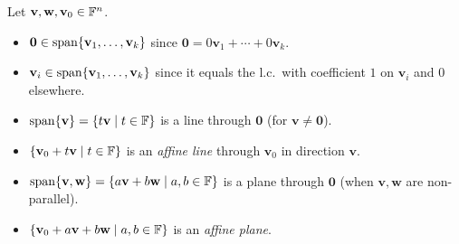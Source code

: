\begin{tipbox}
Let $\mathbf{v},\mathbf{w},\mathbf{v}_0\in\mathbb{F}^n$.
\begin{itemize}
    \item $\mathbf{0}\in\operatorname{span}\{\mathbf{v}_1,\ldots,\mathbf{v}_k\}$ since
          $\mathbf{0}=0\mathbf{v}_1+\cdots+0\mathbf{v}_k$.
    \item $\mathbf{v}_i\in\operatorname{span}\{\mathbf{v}_1,\ldots,\mathbf{v}_k\}$ since it
          equals the l.c.\ with coefficient $1$ on $\mathbf{v}_i$ and $0$
          elsewhere.
    \item $\operatorname{span}\{\mathbf{v}\} = \{t\mathbf{v}\mid t\in\mathbb{F}\}$ is a line through
          $\mathbf{0}$ (for $\mathbf{v}\neq\mathbf{0}$).
    \item $\{\mathbf{v}_0+t\mathbf{v}\mid t\in\mathbb{F}\}$ is an \emph{affine line}
          through $\mathbf{v}_0$ in direction $\mathbf{v}$.
    \item $\operatorname{span}\{\mathbf{v},\mathbf{w}\} = \{a\mathbf{v}+b\mathbf{w}\mid a,b\in\mathbb{F}\}$
          is a plane through $\mathbf{0}$ (when $\mathbf{v},\mathbf{w}$ are
          non-parallel).
    \item $\{\mathbf{v}_0+a\mathbf{v}+b\mathbf{w}\mid a,b\in\mathbb{F}\}$ is an
          \emph{affine plane}.
\end{itemize}
\end{tipbox}
